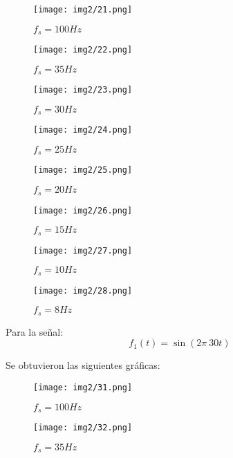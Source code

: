 \begin{figure}[!htbp]
	\centering
	\texttt{[image: img2/21.png]}
	\caption{$f_s= 100 Hz$}
\end{figure}

\begin{figure}[!htbp]
	\centering
	\texttt{[image: img2/22.png]}
	\caption{$f_s= 35 Hz$}
\end{figure}

\newpage

\begin{figure}[!htbp]
	\centering
	\texttt{[image: img2/23.png]}
	\caption{$f_s= 30 Hz$}
\end{figure}

\begin{figure}[!htbp]
	\centering
	\texttt{[image: img2/24.png]}
	\caption{$f_s= 25 Hz$}
\end{figure}

\newpage

\begin{figure}[!htbp]
	\centering
	\texttt{[image: img2/25.png]}
	\caption{$f_s= 20 Hz$}
\end{figure}

\begin{figure}[!htbp]
	\centering
	\texttt{[image: img2/26.png]}
	\caption{$f_s= 15 Hz$}
\end{figure}

\newpage

\begin{figure}[!htbp]
	\centering
	\texttt{[image: img2/27.png]}
	\caption{$f_s= 10 Hz$}
\end{figure}

\begin{figure}[!htbp]
	\centering
	\texttt{[image: img2/28.png]}
	\caption{$f_s= 8 Hz$}
\end{figure}

\newpage

Para la señal:
\begin{equation}
	f_1(t)= \sin (2\pi \ 30 t)
\end{equation}

Se obtuvieron las siguientes gráficas:

\begin{figure}[!htbp]
	\centering
	\texttt{[image: img2/31.png]}
	\caption{$f_s= 100 Hz$}
\end{figure}

\begin{figure}[!htbp]
	\centering
	\texttt{[image: img2/32.png]}
	\caption{$f_s= 35 Hz$}
\end{figure}

